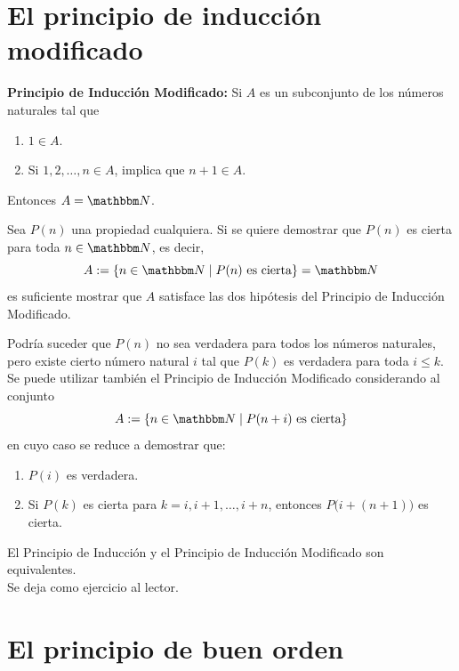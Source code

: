 \section{El principio de inducción modificado}

\noindent\textbf{Principio de Inducción Modificado:} Si $A$ es un subconjunto de los números naturales tal que
\begin{enumerate}[label=\roman*.]
    \item $1 \in A$.
    \item Si $1, 2, \dots , n \in A$, implica que $n+1 \in A$.
\end{enumerate}
    Entonces $A=\NN$.

\begin{observation}
    Sea $P(n)$ una propiedad cualquiera. Si se quiere demostrar que $P(n)$ es cierta para toda $n \in \NN$, es decir,
    $$A:=\left\lbrace n \in \NN \mid P(n) \text{ es cierta} \right\rbrace = \NN$$
    es suficiente mostrar que $A$ satisface las dos hipótesis del Principio de Inducción Modificado.
\end{observation}

\begin{observation}
    Podría suceder que $P(n)$ no sea verdadera para todos los números naturales, pero existe cierto número natural $i$ tal que $P(k)$ es verdadera para toda $i \leq k$. Se puede utilizar también el Principio de Inducción Modificado considerando al conjunto
    $$A:=\left\lbrace n \in \NN \mid P(n+i) \text{ es cierta} \right\rbrace $$
    en cuyo caso se reduce a demostrar que:
    \begin{enumerate}[label=\roman*.]
        \item $P(i)$ es verdadera.
        \item Si $P(k)$ es cierta para $k=i, i+1, \dots, i+n$, entonces $P\big( i+(n+1) \big)$ es cierta.
    \end{enumerate}
\end{observation}

\begin{proposition}
    El Principio de Inducción y el Principio de Inducción Modificado son equivalentes. \\
    \demostracion Se deja como ejercicio al lector.
\end{proposition}

\newpage

\section{El principio de buen orden}

